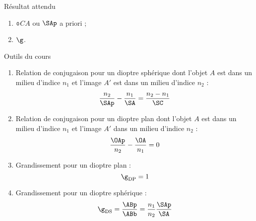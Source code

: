 \documentclass[10pt,notitlepage]{book}
\begin{document}
\begin{NCprop}{Résultat attendu}
    \begin{enumerate}
        \item $\obar{CA}$ ou $\SAp$ a priori ;
        \item $\g$.
    \end{enumerate}
\end{NCprop}

\begin{NCdemo}{Outils du cours}
    \begin{enumerate}
        \item Relation de conjugaison pour un dioptre sphérique dont l'objet
            $A$ est dans un milieu d'indice $n_1$ et l'image $A'$ est dans un
            milieu d'indice $n_2$ :
            \[ \frac{n_2}{\SAp} - \frac{n_1}{\SA} = \frac{n_2 - n_1}{\SC}\]
        \item Relation de conjugaison pour un dioptre plan dont l'objet $A$ est
            dans un milieu d'indice $n_1$ et l'image $A'$ dans un milieu
            d'indice $n_2$ :
            \[ \frac{\OAp}{n_2} - \frac{\OA}{n_1} = 0 \]
        \item Grandissement pour un dioptre plan :
            \[ \g _\mathrm{DP} = 1 \]
        \item Grandissement pour un dioptre sphérique :
            \[ \g _\mathrm{DS} = \frac{\ABp}{\ABb} = \frac{n_1}{n_2}
            \frac{\SAp}{\SA}\]
    \end{enumerate}
\end{NCdemo}
\end{document}
